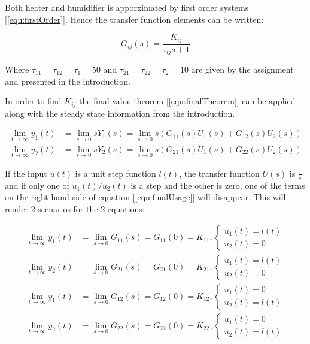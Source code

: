 \documentclass[a4paper, titlepage]{article}
\begin{document}
Both heater and humidifier is apporximated by first order systems [\ref{equ:firstOrder}].
Hence the transfer function elements can be written:

\begin{equation}
G_{ij}(s) = \frac{K_{ij}}{\tau_{ij} s + 1}
\end{equation}

Where $\tau_{11} = \tau_{12} = \tau_1 = 50$ and $\tau_{21} = \tau_{22} = \tau_2 = 10$ are given by the assignment and presented in the introduction.

In order to find $K_{ij}$ the final value theorem [\ref{equ:finalTheorem}] can be applied along with the steady state information from the introduction.

\begin{equation}
\begin{split}
\lim_{t \to \infty} y_{1}(t) &= 
\lim_{s \to 0} sY_{1}(s) = 
\lim_{s \to 0} s(G_{11}(s)U_{1}(s) + G_{12}(s)U_{2}(s)) \\
\lim_{t \to \infty} y_{2}(t) &= 
\lim_{s \to 0} sY_{2}(s) = 
\lim_{s \to 0} s(G_{21}(s)U_{1}(s) + G_{22}(s)U_{2}(s))
\end{split}
\label{equ:finalUsage}
\end{equation}

If the input $u(t)$ is a unit step function $l(t)$, the transfer function $U(s)$ is $\frac{1}{s}$ and if only one of $u_1(t)/u_2(t)$ is a step and the other is zero, one of the terms on the right hand side of equation [\ref{equ:finalUsage}] will disappear.
This will render 2 scenarios for the 2 equations:

\begin{equation}
\begin{split}
\lim_{t \to \infty} y_{1}(t) &= 
\lim_{s \to 0} G_{11}(s) = G_{11}(0) = K_{11}, 
\begin{cases}
 u_1(t) = l(t) \\ u_2(t) = 0 
\end{cases} \\
\lim_{t \to \infty} y_{2}(t) &= 
\lim_{s \to 0} G_{21}(s) = G_{21}(0) = K_{21}, 
\begin{cases}
 u_1(t) = l(t) \\ u_2(t) = 0 
\end{cases} \\
\lim_{t \to \infty} y_{1}(t) &= 
\lim_{s \to 0} G_{12}(s) = G_{12}(0) = K_{12}, 
\begin{cases}
 u_1(t) = 0 \\ u_2(t) = l(t) 
\end{cases} \\
\lim_{t \to \infty} y_{2}(t) &= 
\lim_{s \to 0} G_{22}(s) = G_{22}(0) = K_{22}, 
\begin{cases}
 u_1(t) = 0 \\ u_2(t) = l(t) 
\end{cases} \\
\end{split}
\end{equation}
\end{document}
